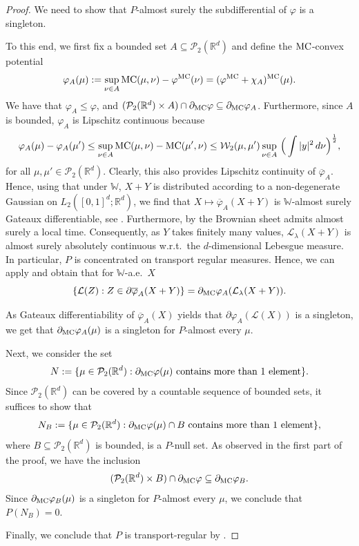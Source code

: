 \documentclass[a4paper]{amsart}
\numberwithin{theorem}{section}
\theoremstyle{definition}
\newcommand{\R}{\mathbb{R}}
\newcommand{\law}{\mathcal{L}}
\newcommand{\W}{\mathcal{W}}
\newcommand{\WW}{\mathbb{W}}
\newcommand{\Pc}{\mathcal P}
\renewcommand{\phi}{\varphi}
\newcommand{\mc}{\textup{MC}}
\newcommand{\MC}{\textup{MC}}
\begin{document}
\begin{proof}
    We need to show that $P$-almost surely the subdifferential of $\phi$ is a singleton.

    To this end, we first fix a bounded set $A \subseteq \Pc_2(\R^d)$ and define the $\mc$-convex potential
    \[
        \phi_A(\mu) := \sup_{\nu \in A} \mc(\mu,\nu) - \phi^\mc(\nu) = (\phi^\mc + \chi_A)^{\mc}(\mu).
    \]
    We have that $\phi_A \le \phi$, and $(\Pc_2(\R^d) \times A) \cap \partial_\mc \phi \subseteq \partial_\mc \phi_A$.
    Furthermore, since $A$ is bounded, $\phi_A$ is Lipschitz continuous because
    \[
        \phi_A(\mu) - \phi_A(\mu') \le \sup_{\nu \in A} \mc(\mu,\nu) - \mc(\mu',\nu) \le \W_2(\mu,\mu') \sup_{\nu \in A} \, \Big( \int |y|^2 \, d\nu \Big)^\frac12,
    \]
    for all $\mu,\mu' \in \Pc_2(\R^d)$.
    Clearly, this also provides Lipschitz continuity of $\overline{\phi}_A$.
    Hence, using that under $\WW$, $X + Y$ is  distributed according to a non-degenerate Gaussian on $L_2([0,1]^d;\R^d)$, we find that $X \mapsto \overline{\phi}_A(X + Y)$ is $\WW$-almost surely Gateaux differentiable, see \cite{Ph78}.
    Furthermore, by \cite[Theorem 3.1 and preceding discussion]{AyWuYi08} the Brownian sheet admits almost surely a local time.
    Consequently, as $Y$ takes finitely many values, $\law_\lambda(X + Y)$ is almost surely absolutely continuous w.r.t.\ the $d$-dimensional Lebesgue measure.
    In particular, $P$ is concentrated on transport regular measures.
    Hence, we can apply  and obtain that for $\WW$-a.e.\ $X$ 
    \[
        \{ \law(Z) : Z \in \partial \overline{\phi}_A(X + Y) \} = \partial_\MC \phi_A(\law_\lambda(X + Y)).
    \]
    
    As Gateaux differentiability of $\overline{\phi}_A(X)$ yields that $\partial \phi_A(\law(X))$ is a singleton, we get that $\partial_\mc \phi_A(\mu)$ is a singleton for $P$-almost every $\mu$.
    
    Next, we consider the set
    \[
        N := \{ \mu \in \Pc_2(\R^d) : \partial_\mc \phi(\mu) \text{ contains more than 1 element} \}.
    \]
    Since $\Pc_2(\R^d)$ can be covered by a countable sequence of bounded sets, it suffices to show that
    \[
        N_B := \{ \mu \in \Pc_2(\R^d) : \partial_\mc \phi(\mu) \cap B  \text{ contains more than 1 element} \},
    \]
    where $B \subseteq \Pc_2(\R^d)$ is bounded, is a $P$-null set.
    As observed in the first part of the proof, we have the inclusion
    \[
        (\Pc_2(\R^d) \times B) \cap \partial_\mc \phi \subseteq \partial_\mc \phi_B.
    \]
    Since $\partial_\mc \phi_B(\mu)$ is a singleton for $P$-almost every $\mu$, we conclude that $P(N_B) = 0$.

    Finally, we conclude that $P$ is transport-regular by .
\end{proof}
\end{document}
